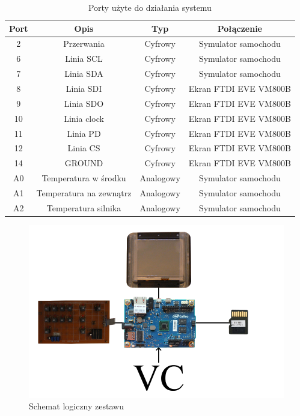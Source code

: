 \documentclass{xmgr}
\begin{document}
\begin{table}[!tbh]
\begin{tabular}{|c|c|c|c|} \hline
\textbf{Port} & \textbf{Opis} & \textbf{Typ} & \textbf{Połączenie} \\ \hline
	2 & Przerwania & Cyfrowy & Symulator samochodu\\ \hline
	6 & Linia SCL & Cyfrowy & Symulator samochodu\\ \hline
	7 & Linia SDA & Cyfrowy & Symulator samochodu\\ \hline
	8 & Linia SDI & Cyfrowy & Ekran FTDI EVE VM800B\\ \hline
	9 & Linia SDO & Cyfrowy & Ekran FTDI EVE VM800B\\ \hline
	10 & Linia clock & Cyfrowy & Ekran FTDI EVE VM800B\\ \hline
	11 & Linia PD & Cyfrowy & Ekran FTDI EVE VM800B\\ \hline
	12 & Linia CS & Cyfrowy & Ekran FTDI EVE VM800B\\ \hline
	14 & GROUND & Cyfrowy & Ekran FTDI EVE VM800B\\ \hline
	A0 & Temperatura w środku & Analogowy & Symulator samochodu\\ \hline
	A1 & Temperatura na zewnątrz & Analogowy & Symulator samochodu\\ \hline
	A2 & Temperatura silnika & Analogowy & Symulator samochodu\\ \hline
\end{tabular}
\caption{Porty użyte do działania systemu}
\end{table}

\begin{figure}[!h]
    \centering
    	\includegraphics[height=0.33\textheight]{images/schemat.png}
    \caption{Schemat logiczny zestawu}
\end{figure}
\end{document}
